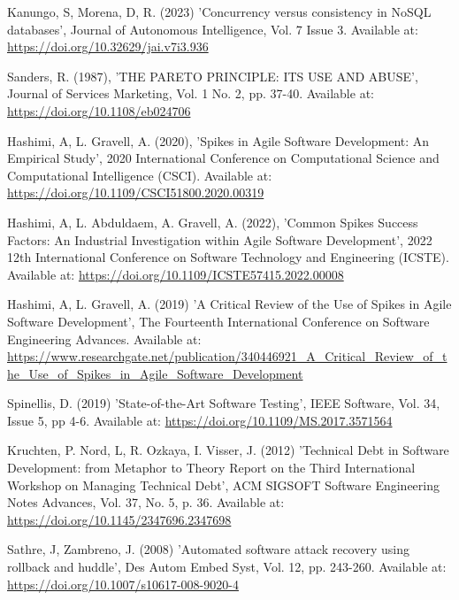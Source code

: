 \noindent Kanungo, S, Morena, D, R. (2023) 'Concurrency versus consistency in NoSQL databases', Journal of Autonomous Intelligence, Vol. 7 Issue 3. Available at: \url{https://doi.org/10.32629/jai.v7i3.936}
\vspace{0.2cm}

\noindent Sanders, R. (1987), 'THE PARETO PRINCIPLE: ITS USE AND ABUSE', Journal of Services Marketing, Vol. 1 No. 2, pp. 37-40. Available at: \url{https://doi.org/10.1108/eb024706}
\vspace{0.2cm}

\noindent Hashimi, A, L. Gravell, A. (2020), 'Spikes in Agile Software Development: An Empirical Study', 2020 International Conference on Computational Science and Computational Intelligence (CSCI). Available at: \url{https://doi.org/10.1109/CSCI51800.2020.00319}
\vspace{0.2cm}

\noindent Hashimi, A, L. Abduldaem, A. Gravell, A. (2022), 'Common Spikes Success Factors: An Industrial Investigation within Agile Software Development', 2022 12th International Conference on Software Technology and Engineering (ICSTE). Available at: \url{https://doi.org/10.1109/ICSTE57415.2022.00008}
\vspace{0.2cm}

\noindent Hashimi, A, L. Gravell, A. (2019) 'A Critical Review of the Use of Spikes in Agile Software Development', The Fourteenth International Conference on Software Engineering Advances. Available at: \url{https://www.researchgate.net/publication/340446921_A_Critical_Review_of_the_Use_of_Spikes_in_Agile_Software_Development}
\vspace{0.2cm}

\noindent Spinellis, D. (2019) 'State-of-the-Art Software Testing', IEEE Software, Vol. 34, Issue 5, pp 4-6. Available at: \url{https://doi.org/10.1109/MS.2017.3571564}
\vspace{0.2cm}

\noindent Kruchten, P. Nord, L, R. Ozkaya, I. Visser, J. (2012) 'Technical Debt in Software Development: from Metaphor to Theory Report on the Third International Workshop on Managing Technical Debt', ACM SIGSOFT Software Engineering Notes Advances, Vol. 37, No. 5, p. 36. Available at: \url{https://doi.org/10.1145/2347696.2347698}
\vspace{0.2cm}

\noindent Sathre, J, Zambreno, J. (2008) 'Automated software attack recovery using rollback and huddle', Des Autom Embed Syst, Vol. 12, pp. 243-260. Available at: \url{https://doi.org/10.1007/s10617-008-9020-4}
\vspace{0.2cm}

